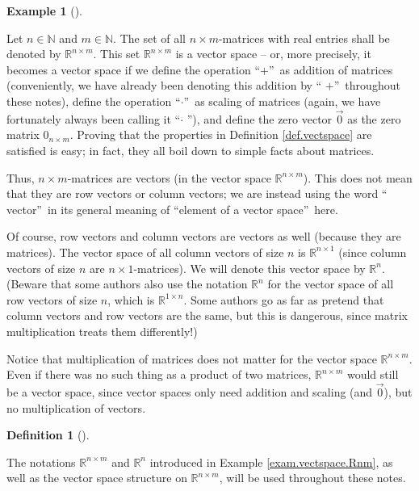 \documentclass[numbers=enddot,12pt,final,onecolumn,notitlepage]{scrartcl}%
\theoremstyle{definition}
\newtheorem{defi}[theo]{Definition}
\newenvironment{definition}[1][]
{\begin{defi}[#1]\begin{leftbar}}
{\end{leftbar}\end{defi}}
\newtheorem{exam}[theo]{Example}
\newenvironment{example}[1][]
{\begin{exam}[#1]\begin{leftbar}}
{\end{leftbar}\end{exam}}
\begin{document}
\begin{example}
\label{exam.vectspace.Rnm}Let $n\in\mathbb{N}$ and $m\in\mathbb{N}$. The set
of all $n\times m$-matrices with real entries shall be denoted by
$\mathbb{R}^{n\times m}$. This set $\mathbb{R}^{n\times m}$ is a vector space
-- or, more precisely, it becomes a vector space if we define the operation
\textquotedblleft$+$\textquotedblright\ as addition of matrices (conveniently,
we have already been denoting this addition by \textquotedblleft%
$+$\textquotedblright\ throughout these notes), define the operation
\textquotedblleft$\cdot$\textquotedblright\ as scaling of matrices (again, we
have fortunately always been calling it \textquotedblleft$\cdot$%
\textquotedblright), and define the zero vector $\overrightarrow{0}$ as the
zero matrix $0_{n\times m}$. Proving that the properties in Definition
\ref{def.vectspace} are satisfied is easy; in fact, they all boil down to
simple facts about matrices.

Thus, $n\times m$-matrices are vectors (in the vector space $\mathbb{R}%
^{n\times m}$). This does not mean that they are row vectors or column
vectors; we are instead using the word \textquotedblleft
vector\textquotedblright\ in its general meaning of \textquotedblleft element
of a vector space\textquotedblright\ here.

Of course, row vectors and column vectors are vectors as well (because they
are matrices). The vector space of all column vectors of size $n$ is
$\mathbb{R}^{n\times1}$ (since column vectors of size $n$ are $n\times
1$-matrices). We will denote this vector space by $\mathbb{R}^{n}$. (Beware
that some authors also use the notation $\mathbb{R}^{n}$ for the vector space
of all row vectors of size $n$, which is $\mathbb{R}^{1\times n}$. Some
authors go as far as pretend that column vectors and row vectors are the same,
but this is dangerous, since matrix multiplication treats them differently!)

Notice that multiplication of matrices does not matter for the vector space
$\mathbb{R}^{n\times m}$. Even if there was no such thing as a product of two
matrices, $\mathbb{R}^{n\times m}$ would still be a vector space, since vector
spaces only need addition and scaling (and $\overrightarrow{0}$), but no
multiplication of vectors.
\end{example}

\begin{definition}
The notations $\mathbb{R}^{n\times m}$ and $\mathbb{R}^{n}$ introduced in
Example \ref{exam.vectspace.Rnm}, as well as the vector space structure on
$\mathbb{R}^{n\times m}$, will be used throughout these notes.
\end{definition}
\end{document}
